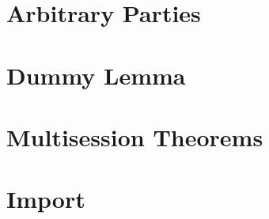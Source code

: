 \documentclass[acmsmall, screen, review, anonymous]{acmart}
\begin{document}
%

\section{Arbitrary Parties} \label{app:arbparties}


\section{Dummy Lemma} \label{app:dummy}


\section{Multisession Theorems} \label{app:ms}


\section{Import} \label{app:import}


%

%

%

\pagebreak

%

%

%
%
%
%
%
%
%
%
%
\end{document}
